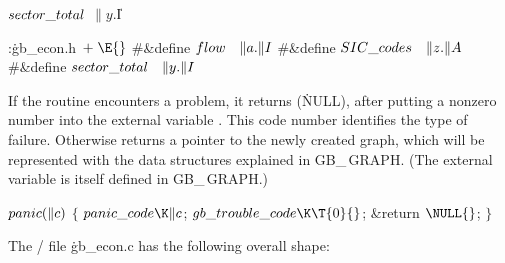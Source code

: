 \Y\B\4\D$\\{sector\_total}$ \5
$\|y.{}$\|I\par
\Y\B\4:\.{gb\_econ.h\,}\X${}\mathrel+\E{}$\6
\8\#\&{define} ${}\\{flow}\hbox{\quad}\|a.\|I{}$\6
\8\#\&{define} ${}\\{SIC\_codes}\hbox{\quad}\|z.\|A{}$\6
\8\#\&{define} ${}\\{sector\_total}\hbox{\quad}\|y.\|I{}$\par
\fi

If the  routine encounters a problem, it returns \PB{$\NULL$}
(\.{NULL}), after putting a nonzero number into the external variable
. This code number identifies the type of failure.
Otherwise  returns a pointer to the newly created graph, which
will be represented with the data structures explained in {\sc GB\_\,GRAPH}.
(The external variable  is itself defined in
{\sc GB\_\,GRAPH}.)

\Y\B\4\D$\\{panic}(\|c)$ \5
${}\{{}$\5
\1${}\\{panic\_code}\K\|c{}$;\5
${}\\{gb\_trouble\_code}\K\T{0}{}$;\5
\&{return} ${}\NULL{}$;\5
${}\}{}$\2\par
\fi

The \CEE/ file \.{gb\_econ.c} has the following overall shape:

